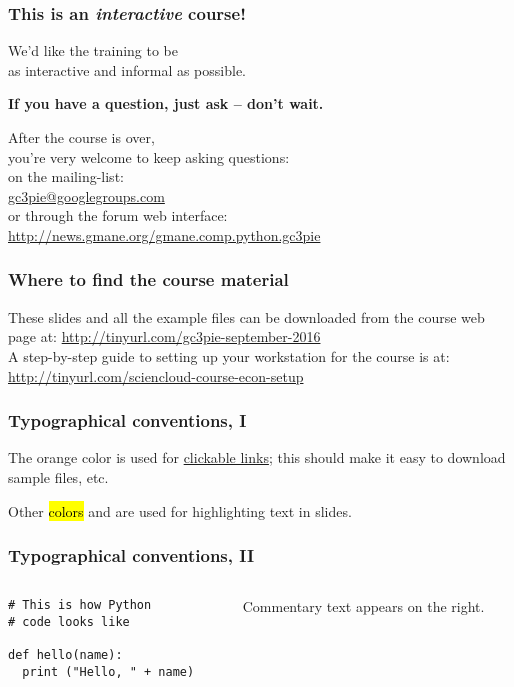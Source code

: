 \documentclass[english,serif,mathserif,xcolor=pdftex,dvipsnames,table]{beamer}
\begin{document}
\begin{frame}
  \frametitle{This is an \emph{interactive} course!}
  \begin{center}
    We'd like the training to be \\ as interactive and informal as
    possible.

    \+ \textbf{If you have a question, just ask -- don't wait.}

    \+
    After the course is over, \\ you're very welcome to keep asking questions:
    \\[1ex]
    on the mailing-list: \\
    \href{mailto:gc3pie@googlegroups.com}{gc3pie@googlegroups.com}
    \\[1ex]
    or through the forum web interface: \\ {\small
      \url{http://news.gmane.org/gmane.comp.python.gc3pie}}
  \end{center}
\end{frame}


\begin{frame}
  \frametitle{Where to find the course material}

  These slides and all the example files can be downloaded from the
  course web page at:
  {\small\url{http://tinyurl.com/gc3pie-september-2016}}\\

  \+
  A step-by-step guide to setting up your workstation for the course is at:
  {\small\url{http://tinyurl.com/sciencloud-course-econ-setup}}
\end{frame}


\begin{frame}
  \frametitle{Typographical conventions, I}

  The orange color is used for
  \href{http://tinyurl.com/gc3pie-september-2016}{clickable
    links}; this should make it easy to download sample files, etc.

  \+
  Other \hl{colors} and  are used for highlighting
  text in slides.
\end{frame}


\begin{frame}[fragile]
  \frametitle{Typographical conventions, II}

    \begin{columns}[t]
    \begin{column}{0.5\textwidth}
\begin{lstlisting}
# This is how Python
# code looks like

def hello(name):
  print ("Hello, " + name)
\end{lstlisting}
    \end{column}
    \begin{column}{0.5\textwidth}
      \raggedleft Commentary text appears on the right.
    \end{column}
  \end{columns}
\end{frame}
\end{document}
